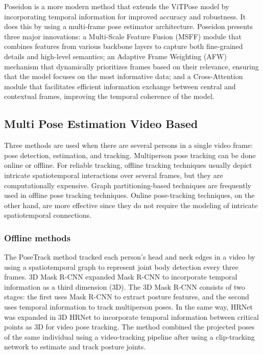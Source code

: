 Poseidon \cite{pace2025poseidon} is a more modern method that extends the ViTPose model \cite{xu2022vitpose} by incorporating temporal information for improved accuracy and robustness. It does this by using a multi-frame pose estimator architecture. 
Poseidon presents three major innovations: a Multi-Scale Feature Fusion (MSFF) module that combines features from various backbone layers to capture both fine-grained details and high-level semantics; an Adaptive Frame Weighting (AFW) 
mechanism that dynamically prioritizes frames based on their relevance, ensuring that the model focuses on the most informative data; and a Cross-Attention module that facilitates efficient information exchange between central and 
contextual frames, improving the temporal coherence of the model.


\subsection{Multi Pose Estimation Video Based}
Three methods are used when there are several persons in a single video frame: pose detection, estimation, and tracking. Multiperson pose tracking can be done online or offline. For reliable tracking, offline tracking techniques 
usually depict intricate spatiotemporal interactions over several frames, but they are computationally expensive. Graph partitioning-based techniques are frequently used in offline pose tracking techniques. Online pose-tracking 
techniques, on the other hand, are more effective since they do not require the modeling of intricate spatiotemporal connections.

\subsubsection{Offline methods}
The PoseTrack method \cite{iqbal2017posetrack} tracked each person's head and neck edges in a video by using a spatiotemporal graph to represent joint body detection every three frames. 3D Mask R-CNN \cite{girdhar2018detect} expanded 
Mask R-CNN \cite{he2017mask} to incorporate temporal information as a third dimension (3D). The 3D Mask R-CNN consists of two stages: the first uses Mask R-CNN to extract posture features, and the second uses temporal information to 
track multiperson poses. In the same way, HRNet \cite{sun2019deep} was expanded in 3D HRNet \cite{wang2020combining} to incorporate temporal information between critical points as 3D for video pose tracking. 
The method combined the projected poses of the same individual using a video-tracking pipeline after using a clip-tracking network to estimate and track posture joints.

